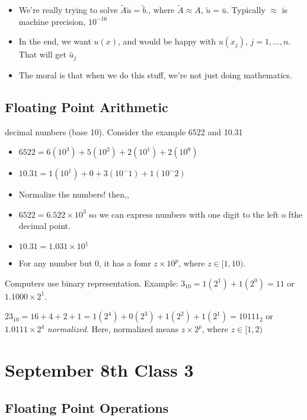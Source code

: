 \begin{itemize}
\begin{enumerate}
    \end{enumerate}
  \item We're really trying to solve $\tilde{A}\tilde{u} =
    \tilde{b}$., where $\tilde{A}\approx A$, $\tilde{u} =
    \bar{u}$. Typically $\approx$ is machine precision, $10^{-16}$

  \item In the end, we want $u(x)$, and would be happy with $u(x_j)$,
    $j=1,\dots, n$. That will get $\tilde{u_j}$
  \item The moral is that when we do this stuff, we're not just doing
    mathematics. 
\end{itemize}

\subsection{Floating Point Arithmetic}
\label{sec:floating}

decimal numbers (base 10).
Consider the example 6522 and 10.31
\begin{itemize}
\item $6522 = 6(10^3) + 5(10^2) + 2(10^1)+ 2(10^0)$
\item $10.31 = 1(10^1) + 0 + 3(10^-1)+ 1(10^-2)$
\item Normalize the numbers! then,,
\item $6522 = 6.522 \times 10^3$ so we can express numbers with one digit to the
  left o fthe decimal point.
\item $10.31 = 1.031 \times 10^1$
\item For any number but 0, it has a fomr $z\times 10^p$, where
  $z\in[1, 10)$.
\end{itemize}

Computers use binary representation. Example: $3_{10} = 1(2^1) + 1(2^0) =
11$ or $1.1000 \times 2^1$.

$23_{10} = 16 + 4 + 2 + 1 = 1(2^4) + 0(2^3) + 1(2^2)+ 1(2^1)= 10111_2$
or $1.0111 \times 2^4$ \emph{normalized}. Here, normalized means
$z\times 2^p$, where $z\in [1, 2)$

\pagebreak
\section{September 8th Class 3}
\label{sec:class3}

\subsection{Floating Point Operations}

